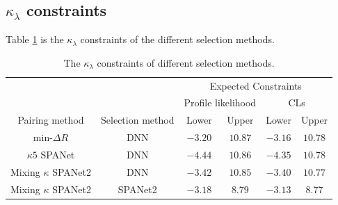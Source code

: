 \documentclass[12pt]{article}
\begin{document}
	\subsection{\texorpdfstring{$\kappa_\lambda$}{kappa} constraints}%
	\label{sub:kappa_constraints}
		Table \ref{tab:kappa_constraint_summary2} is the $\kappa_\lambda$ constraints of the different selection methods.
		\begin{table}[htpb]
			\centering
			\caption{The $\kappa_\lambda$ constraints of different selection methods.}
			\label{tab:kappa_constraint_summary2}
			\begin{tabular}{cc|cc|cc}
									&                  & \multicolumn{4}{c}{Expected Constraints}                         \\
									&                  & \multicolumn{2}{c}{Profile likelihood} & \multicolumn{2}{c}{CLs} \\ \hline
			Pairing method          & Selection method & Lower              & Upper             & Lower       & Upper     \\ \hline
			$\text{min-}\Delta R$   & DNN              & $-3.20$            & $10.87$           & $-3.16$      & $10.78$    \\
			$\kappa 5$ SPANet       & DNN              & $-4.44$            & $10.86$           & $-4.35$      & $10.78$   \\
			Mixing $\kappa$ SPANet2 & DNN              & $-3.42$            & $10.85$           & $-3.40$      & $10.77$   \\
			Mixing $\kappa$ SPANet2 & SPANet2          & $-3.18$            & $8.79$            & $-3.13$      & $8.77$   
			\end{tabular}		
		\end{table}
	
\end{document}
